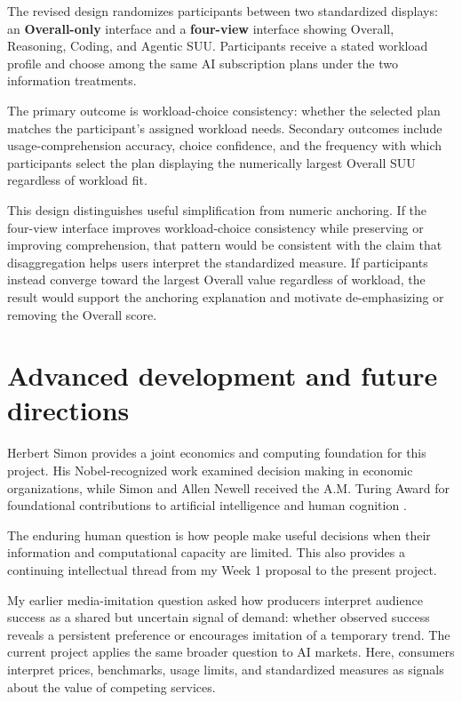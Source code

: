 \documentclass[sigconf,nonacm]{acmart}
\begin{document}
The revised design randomizes participants between two standardized displays:
an \textbf{Overall-only} interface and a \textbf{four-view} interface showing
Overall, Reasoning, Coding, and Agentic SUU. Participants receive a stated
workload profile and choose among the same AI subscription plans under the two
information treatments.

The primary outcome is workload-choice consistency: whether the selected plan
matches the participant's assigned workload needs. Secondary outcomes include
usage-comprehension accuracy, choice confidence, and the frequency with which
participants select the plan displaying the numerically largest Overall SUU
regardless of workload fit.

This design distinguishes useful simplification from numeric anchoring.
If the four-view interface improves workload-choice consistency while preserving
or improving comprehension, that pattern would be consistent with the claim that
disaggregation helps users interpret the standardized measure. If participants
instead converge toward the largest Overall value regardless of workload, the
result would support the anchoring explanation and motivate de-emphasizing or
removing the Overall score.



\section{Advanced development and future directions}

Herbert Simon provides a joint economics and computing foundation for this
project. His Nobel-recognized work examined decision making in economic
organizations, while Simon and Allen Newell received the A.M. Turing Award for
foundational contributions to artificial intelligence and human cognition
\cite{simonNobel,simonTuring}.

The enduring human question is how people make useful decisions when their
information and computational capacity are limited. This also provides a
continuing intellectual thread from my Week 1 proposal to the present project.

My earlier media-imitation question asked how producers interpret audience
success as a shared but uncertain signal of demand: whether observed success
reveals a persistent preference or encourages imitation of a temporary trend.
The current project applies the same broader question to AI markets. Here,
consumers interpret prices, benchmarks, usage limits, and standardized measures
as signals about the value of competing services.
\end{document}
